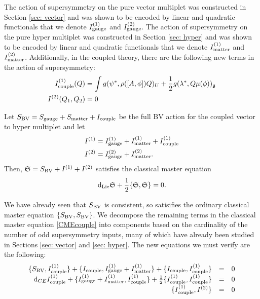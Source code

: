 \documentclass[10pt, oneside]{article}
\begin{document}
The action of supersymmetry on the pure vector multiplet was constructed in Section \ref{sec: vector} and was shown to be encoded by linear and quadratic functionals that we denote $I^{(1)}_{\rm gauge}$ and $I^{(2)}_{\rm gauge}$. 
The action of supersymmetry on the pure hyper multiplet was constructed in Section \ref{sec: hyper} and was shown to be encoded by linear and quadratic functionals that we denote $I^{(1)}_{\rm matter}$ and $I^{(2)}_{\rm matter}$. 
Additionally, in the coupled theory, there are the following new terms in the action of supersymmetry:
\begin{align*}
I^{(1)}_{\rm couple} (Q) & = \int g (\psi^*, \rho([A, \phi]) Q)_U + \frac{1}{2} g (\lambda^*, Q \mu(\phi))_\mathfrak g \\
I^{(2)} (Q_1 , Q_2) & = 0 
\end{align*}

\begin{thm}
Let $S_{\rm BV} = S_{\rm gauge} + S_{\rm matter} + I_{\rm couple}$ be the full BV action for the coupled vector to hyper multiplet and let
\begin{align*}
I^{(1)} & = I^{(1)}_{\rm gauge} + I^{(1)}_{\rm matter} + I^{(1)}_{\rm couple} \\
I^{(2)} & = I^{(2)}_{\rm gauge} + I^{(2)}_{\rm matter} .
\end{align*}
Then, $\mathfrak S = S_{\rm BV} + I^{(1)} + I^{(2)}$ satisfies the classical master equation
\begin{equation}\label{CMEcouple}
{\rm d}_{\rm Lie} \mathfrak S + \frac{1}{2} \{\mathfrak S, \mathfrak S\} = 0 .
\end{equation}
\end{thm}

We have already seen that $S_{\rm BV}$ is consistent, so satisifies the ordinary classical master equation $\{S_{\rm BV}, S_{\rm BV}\}$. 
We decompose the remaining terms in the classical master equation \ref{CMEcouple} into components based on the cardinality of the number of odd supersymmetry inputs, many of which have already been studied in Sections \ref{sec: vector} and \ref{sec: hyper}. 
The new equations we must verify are the following:
\begin{equation}\label{CMEhyper2}
\begin{array}{rrrrrr}
\{S_{\rm BV} , I^{(1)}_{\rm couple}\} + \{I_{\rm couple}, I^{(1)}_{\rm gauge} + I^{(1)}_{\rm matter}\} + \{I_{\rm couple}, I^{(1)}_{\rm couple}\} & = & 0 \\ 
{\rm d}_{CE} I^{(1)}_{\rm couple} + \{I^{(1)}_{\rm gauge} + I^{(1)}_{\rm matter}, I^{(1)}_{\rm couple}\} + \frac{1}{2} \{I_{\rm couple}^{(1)}, I_{\rm couple}^{(1)}\} & = & 0 \\
\{I_{\rm couple}^{(1)}, I^{(2)}\} & =& 0 \\
\end{array}
\end{equation}
\end{document}
